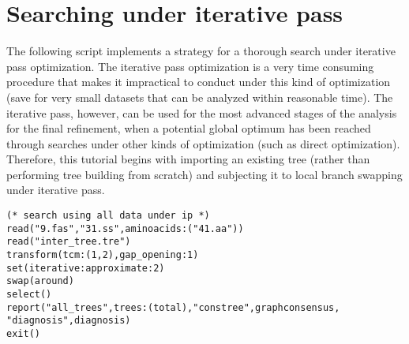 \section{Searching under iterative pass}{\label{tutorial2}}
The following script implements a strategy for a thorough search under iterative pass optimization. The iterative
 pass optimization is a very time consuming procedure that makes it impractical to conduct under this kind of 
optimization (save for very small datasets that can be analyzed within reasonable time). The iterative pass, 
however, can be used for the most advanced stages of the analysis for the final refinement, when a potential 
global optimum has been reached through searches under other kinds of optimization (such as direct 
optimization). Therefore, this tutorial begins with importing an existing tree (rather than performing tree building
 from scratch) and subjecting it to local branch swapping under iterative pass.

\begin{verbatim}
(* search using all data under ip *)
read("9.fas","31.ss",aminoacids:("41.aa"))
read("inter_tree.tre")
transform(tcm:(1,2),gap_opening:1)
set(iterative:approximate:2)
swap(around)
select()
report("all_trees",trees:(total),"constree",graphconsensus,
"diagnosis",diagnosis)
exit()
\end{verbatim}


